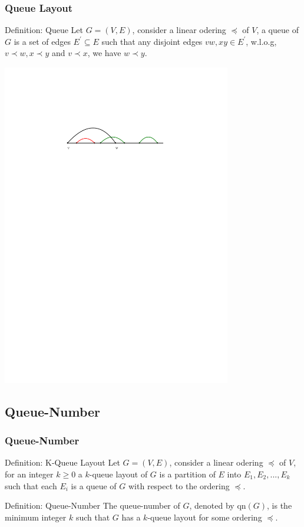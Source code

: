 \documentclass{beamer}
\begin{document}
	\begin{frame}
		\frametitle{Queue Layout}
		\begin{block}{Definition: Queue}
			Let $G = (V,E)$, consider a linear odering $\preceq$ of $V$, a queue of $G$ is a set of edges $E^\prime \subseteq E$ such that any disjoint edges $vw,xy \in E^\prime$, w.l.o.g, $v \prec w, x \prec y$ and $v \prec x$, we have $w \prec y$.
		\end{block}
		\begin{center}
			\vfill
			\includegraphics[width=0.75\textwidth]{pics/vwxy.pdf}
		\end{center}
	\end{frame}
	
	\subsection{Queue-Number}
	\begin{frame}
		\frametitle{Queue-Number}
		\onslide<1->
		{
			\begin{block}{Definition: K-Queue Layout}
				Let $G = (V,E)$, consider a linear odering $\preceq$ of $V$, for an integer $k \ge 0$ a $k$-queue layout of $G$ is a partition of $E$ into $E_1,E_2,...,E_k$ such that each $E_i$ is a queue of $G$  with respect to the ordering $\preceq$.
			\end{block}
		}\pause
		
		\onslide<2->
		{
			\begin{block}{Definition: Queue-Number}
				The queue-number of $G$, denoted by qn$(G)$, is the minimum integer $k$ such that $G$ has a $k$-queue layout for some ordering $\preceq$.
			\end{block}
		}
	\end{frame}
	
\end{document}
